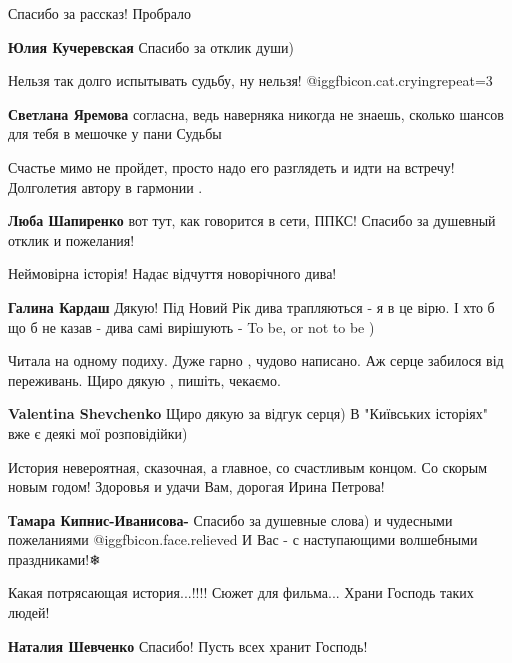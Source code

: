 \begin{itemize}
Спасибо за рассказ! Пробрало

\textbf{Юлия Кучеревская} Спасибо за отклик души)

Нельзя так долго испытывать судьбу, ну нельзя! @igg{fbicon.cat.crying}{repeat=3} 

\textbf{Светлана Яремова} согласна, ведь наверняка никогда не знаешь, сколько шансов для тебя в мешочке у пани Судьбы

Счастье мимо не пройдет, просто надо его разглядеть и идти на встречу! Долголетия автору в гармонии .

\textbf{Люба Шапиренко} вот тут, как говорится в сети, ППКС! Спасибо за душевный отклик и пожелания!

Неймовірна історія! Надає відчуття новорічного дива!

\begin{itemize} %
\textbf{Галина Кардаш} Дякую! Під Новий Рік дива трапляються - я в це вірю. І хто б що б не казав - дива самі вирішують - To be, or not to be )
\end{itemize} %

Читала на одному подиху.
Дуже гарно , чудово написано.
Аж серце забилося від переживань.
Щиро дякую , пишіть, чекаємо.

\begin{itemize} %
\textbf{Valentina Shevchenko} Щиро дякую за відгук серця) В "Київських історіях" вже є деякі мої розповідійки)
\end{itemize} %


История невероятная, сказочная, а главное, со счастливым концом. Со скорым
новым годом! Здоровья и удачи Вам, дорогая Ирина Петрова!

\begin{itemize} %
\textbf{Тамара Кипнис-Иванисова-} Спасибо за душевные слова) и чудесными пожеланиями @igg{fbicon.face.relieved}  И Вас - с наступающими волшебными праздниками!❄
\end{itemize} %


Какая потрясающая история...!!!! Сюжет для фильма... Храни Господь таких людей!

\textbf{Наталия Шевченко} Спасибо! Пусть всех хранит Господь!


\end{itemize}
